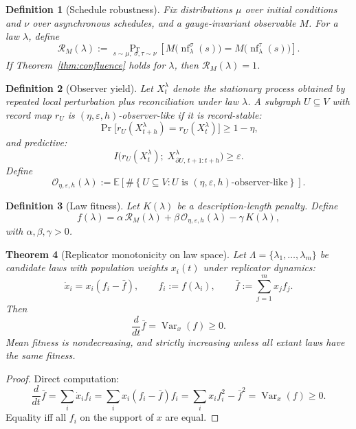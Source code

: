\documentclass[11pt]{article}
\newtheorem{theorem}{Theorem}[section]
\newtheorem{definition}[theorem]{Definition}
\begin{document}
\begin{definition}[Schedule robustness]\label{def:robustness}
Fix distributions $\mu$ over initial conditions and $\nu$ over asynchronous schedules, and a gauge-invariant observable $M$. For a law $\lambda$, define
\[
\mathcal{R}_M(\lambda)
:=
\Pr_{s\sim\mu,\;\sigma,\tau\sim\nu}
\!\left[
M\bigl(\operatorname{nf}^{\sigma}_\lambda(s)\bigr)
=
M\bigl(\operatorname{nf}^{\tau}_\lambda(s)\bigr)
\right].
\]
If Theorem~\ref{thm:confluence} holds for $\lambda$, then $\mathcal{R}_M(\lambda)=1$.
\end{definition}

\begin{definition}[Observer yield]\label{def:yield}
Let $X_t^\lambda$ denote the stationary process obtained by repeated local perturbation plus reconciliation under law $\lambda$. A subgraph $U\subseteq V$ with record map $r_U$ is $(\eta,\varepsilon,h)$-observer-like if it is record-stable:
\[
\Pr\bigl[r_U(X_{t+h}^\lambda)=r_U(X_t^\lambda)\bigr]\ge 1-\eta,
\]
and predictive:
\[
I\bigl(r_U(X_t^\lambda);\; X_{\partial U,\,t+1:t+h}^\lambda\bigr)\ge\varepsilon.
\]
Define
\[
\mathcal{O}_{\eta,\varepsilon,h}(\lambda)
:=
\mathbb{E}\!\left[
\#\left\{
U\subseteq V:
U \text{ is } (\eta,\varepsilon,h)\text{-observer-like}
\right\}
\right].
\]
\end{definition}

\begin{definition}[Law fitness]\label{def:fitness}
Let $K(\lambda)$ be a description-length penalty. Define
\[
f(\lambda) = \alpha\,\mathcal{R}_M(\lambda) + \beta\,\mathcal{O}_{\eta,\varepsilon,h}(\lambda) - \gamma\,K(\lambda),
\]
with $\alpha,\beta,\gamma>0$.
\end{definition}

\begin{theorem}[Replicator monotonicity on law space]\label{thm:replicator}
Let $\Lambda=\{\lambda_1,\dots,\lambda_m\}$ be candidate laws with population weights $x_i(t)$ under replicator dynamics:
\[
\dot{x}_i = x_i(f_i - \bar{f}),
\qquad
f_i := f(\lambda_i),
\qquad
\bar{f} := \sum_{j=1}^m x_j f_j.
\]
Then
\[
\frac{d}{dt}\bar{f} = \operatorname{Var}_x(f) \ge 0.
\]
Mean fitness is nondecreasing, and strictly increasing unless all extant laws have the same fitness.
\end{theorem}

\begin{proof}
Direct computation:
\[
\frac{d}{dt}\bar{f}
=
\sum_i \dot{x}_i f_i
=
\sum_i x_i(f_i - \bar{f})f_i
=
\sum_i x_i f_i^2 - \bar{f}^2
=
\operatorname{Var}_x(f) \ge 0.
\]
Equality iff all $f_i$ on the support of $x$ are equal.
\end{proof}
\end{document}

